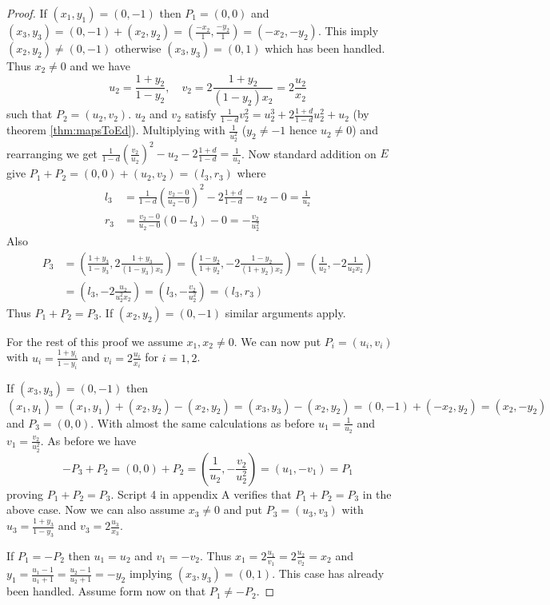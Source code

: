 \begin{proof}
If $(x_1,y_1)=(0,-1)$ then $P_1=(0,0)$ and $(x_3,y_3)=(0,-1)+(x_2,y_2)=\left(\frac{-x_2}{1},\frac{-y_2}{1}\right)=(-x_2,-y_2)$. This imply $(x_2,y_2)\neq (0,-1)$ otherwise $(x_3,y_3)=(0,1)$ which has been handled. Thus $x_2\neq 0$ and we have 
\[
	u_2=\frac{1+y_2}{1-y_2},\quad v_2=2\frac{1+y_2}{(1-y_2)x_2}=2\frac{u_2}{x_2}
\]
such that $P_2=(u_2,v_2)$. $u_2$ and $v_2$ satisfy $\frac{1}{1-d}v_2^2 = u_2^3+2\frac{1+d}{1-d}u_2^2+u_2$ (by theorem \ref{thm:mapsToEd}). Multiplying with $\frac{1}{u_2^2}$ ($y_2\neq -1$ hence $u_2\neq 0$) and rearranging we get $\frac{1}{1-d}\left(\frac{v_2}{u_2}\right)^2-u_2-2\frac{1+d}{1-d}=\frac{1}{u_2}$. Now standard addition on $E$ give $P_1+P_2=(0,0)+(u_2,v_2)=(l_3,r_3)$ where
\begin{align*}
	l_3 &= \frac{1}{1-d}\left(\frac{v_2-0}{u_2-0}\right)^2-2\frac{1+d}{1-d}-u_2-0 = \frac{1}{u_2} \\
	r_3 &= \frac{v_2-0}{u_2-0}\left( 0-l_3\right)-0 =-\frac{v_2}{u_2^2} 
\end{align*}
Also
\begin{align*}
	P_3 &= \left(\frac{1+y_3}{1-y_3},2\frac{1+y_3}{(1-y_3)x_3}\right)
	    = \left(\frac{1-y_2}{1+y_2},-2\frac{1-y_2}{(1+y_2)x_2}\right)
	    = \left(\frac{1}{u_2},-2\frac{1}{u_2x_2}\right)\\
	    &= \left(l_3,-2\frac{u_2}{u_2^2x_2}\right)
		= \left(l_3,-\frac{v_2}{u_2^2}\right)
		= \left(l_3,r_3\right)
\end{align*}
Thus $P_1+P_2=P_3$. If $(x_2,y_2)=(0,-1)$ similar arguments apply. 

For the rest of this proof we assume $x_1,x_2\neq 0$. We can now put $P_i=(u_i,v_i)$ with $u_i=\frac{1+y_i}{1-y_i}$ and $v_i=2\frac{u_i}{x_i}$ for $i=1,2$. 

If $(x_3,y_3)=(0,-1)$ then $(x_1,y_1)=(x_1,y_1)+(x_2,y_2)-(x_2,y_2)=(x_3,y_3)-(x_2,y_2)=(0,-1)+(-x_2,y_2)=(x_2,-y_2)$ and $P_3=(0,0)$. With almost the same calculations as before $u_1=\frac{1}{u_2}$ and $v_1=\frac{v_2}{u_2^2}$. As before we have
\[
	-P_3+P_2=(0,0)+P_2=\left(\frac{1}{u_2},-\frac{v_2}{u_2^2}\right)=(u_1,-v_1)=P_1
\]
proving $P_1+P_2=P_3$. Script 4 in appendix A verifies that $P_1+P_2=P_3$ in the above case. Now we can also assume $x_3\neq 0$ and put $P_3=(u_3,v_3)$ with $u_3=\frac{1+y_3}{1-y_3}$ and $v_3=2\frac{u_3}{x_3}$. 

If $P_1=-P_2$ then $u_1=u_2$ and $v_1=-v_2$. Thus $x_1=2\frac{u_1}{v_1}=2\frac{u_2}{v_2}=x_2$ and $y_1=\frac{u_1-1}{u_1+1}=\frac{u_2-1}{u_2+1}=-y_2$ implying $(x_3,y_3)=(0,1)$. This case has already been handled. Assume form now on that $P_1\neq -P_2$. 


\end{proof}
